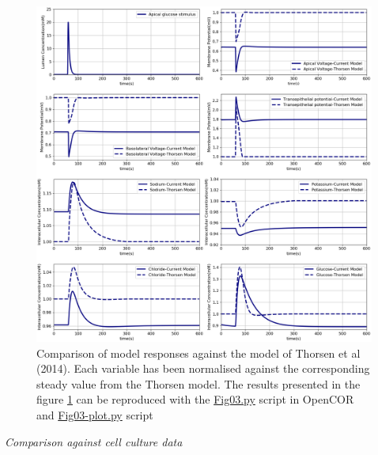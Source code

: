 \documentclass[fleqn,10pt]{physiome}
\begin{document}
\begin{figure}[ht]
\centering
\includegraphics[width=0.8\linewidth]{fig03.png}
\caption{Comparison of model responses against the model
of Thorsen et al (2014). Each variable has been normalised
against the corresponding steady value from the Thorsen model. The results presented in the figure \ref{fig03} can be reproduced with the \href{https://models.physiomeproject.org/workspace/572/file/59488c15178b09bcb5b11f795383b1435f7b7ef1/SEDML_files/Fig03.py}{Fig03.py} script in OpenCOR and \href{https://models.physiomeproject.org/workspace/572/file/59488c15178b09bcb5b11f795383b1435f7b7ef1/SEDML_files/Fig03-plot.py}{Fig03-plot.py} script}
\label{fig03}
\end{figure}

\textit{Comparison against cell culture data}\newline
\end{document}
